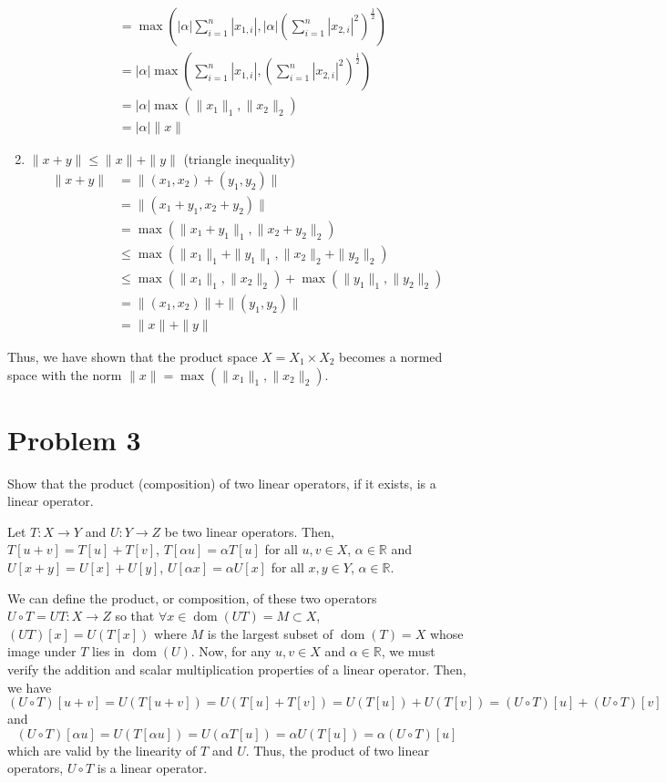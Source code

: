 \documentclass[12pt]{article}
\DeclareMathOperator{\dom}{dom}
\begin{document}
\begin{enumerate}
\begin{align*}
            &= \max(|\alpha|\sum_{i=1}^n |x_{1,i}|, |\alpha|(\sum_{i=1}^n |x_{2,i}|^2)^{\frac{1}{2}}) \\
            &= |\alpha|\max(\sum_{i=1}^n |x_{1,i}|, (\sum_{i=1}^n |x_{2,i}|^2)^{\frac{1}{2}}) \\
            &= |\alpha|\max(\|x_1\|_1, \|x_2\|_2) \\
            &= |\alpha|\|x\|
        \end{align*}
    \item $\|x + y\| \leq \|x\| + \|y\|$ (triangle inequality)
        \begin{align*}
            \|x + y\| &= \|(x_1,x_2) + (y_1,y_2)\| \\
            &= \|(x_1 + y_1, x_2 + y_2)\| \\
            &= \max(\|x_1 + y_1\|_1, \|x_2 + y_2\|_2) \\
            &\leq \max(\|x_1\|_1 + \|y_1\|_1, \|x_2\|_2 + \|y_2\|_2) \\
            &\leq \max(\|x_1\|_1, \|x_2\|_2) + \max(\|y_1\|_1, \|y_2\|_2) \\
            &= \|(x_1,x_2)\| + \|(y_1,y_2)\| \\
            &= \|x\| + \|y\|
        \end{align*}
\end{enumerate}
Thus, we have shown that the product space $X=X_1 \times X_2$ becomes a normed space with the norm
$\|x\|=\max(\|x_1\|_1,\|x_2\|_2)$.


\newpage
\section{Problem 3}
\begin{mdframed}
    Show that the product (composition) of two linear operators, if it exists, is a linear operator.
\end{mdframed}
Let $T: X \rightarrow Y$ and $U: Y \rightarrow Z$ be two linear operators. Then, $T[u+v]=T[u]+T[v]$, 
$T[\alpha u]=\alpha T[u]$ for all $u,v \in X$, $\alpha \in \mathbb{R}$ and $U[x+y]=U[x]+U[y]$, 
$U[\alpha x] = \alpha U[x]$ for all $x,y \in Y$, $\alpha \in \mathbb{R}$.


We can define the product, or composition, of these two operators $U \circ T = UT: X \rightarrow Z$ so that 
$\forall x \in \dom{(UT)}=M \subset X$, $(UT)[x] = U(T[x])$ where $M$ is the largest subset of
$\dom{(T)}=X$ whose image under $T$ lies in $\dom{(U)}$. Now, for any $u,v \in X$ and $\alpha \in \mathbb{R}$,
we must verify the addition and scalar multiplication properties of a linear operator. Then, we have
\begin{equation}
    (U \circ T)[u+v] = U(T[u+v]) = U(T[u] + T[v]) = U(T[u]) + U(T[v]) = (U \circ T)[u] + (U \circ T)[v]
\end{equation}
and
\begin{equation}
    (U \circ T)[\alpha u] = U(T[\alpha u]) = U(\alpha T[u]) = \alpha U(T[u]) = \alpha (U \circ T)[u]
\end{equation}
which are valid by the linearity of $T$ and $U$. Thus, the product of two linear operators, $U \circ T$ 
is a linear operator.
\end{document}
